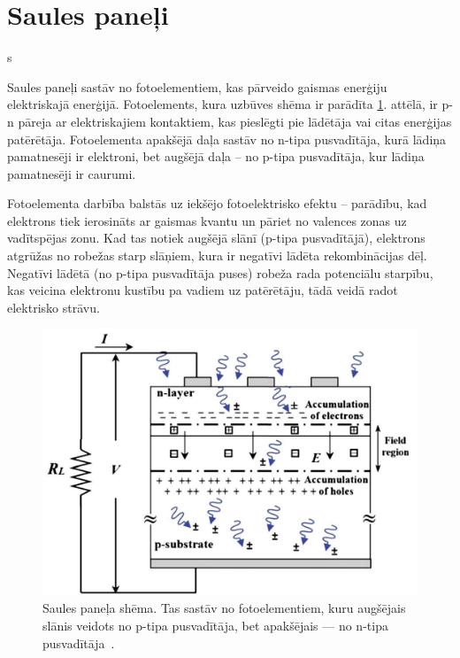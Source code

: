 \section{Saules paneļi}s

Saules paneļi sastāv no fotoelementiem, kas pārveido gaismas enerģiju elektriskajā enerģijā. Fotoelements, kura uzbūves shēma ir parādīta \ref{fig:PV}. attēlā, ir p-n pāreja ar elektriskajiem kontaktiem, kas pieslēgti pie lādētāja vai citas enerģijas patērētāja. Fotoelementa apakšējā daļa sastāv no n-tipa pusvadītāja, kurā lādiņa pamatnesēji ir elektroni, bet augšējā daļa -- no p-tipa pusvadītāja, kur lādiņa pamatnesēji ir caurumi. 

Fotoelementa darbība balstās uz iekšējo fotoelektrisko efektu -- parādību, kad elektrons tiek ierosināts ar gaismas kvantu un pāriet no valences zonas uz vadītspējas zonu. Kad tas notiek augšējā slānī (p-tipa pusvadītājā), elektrons atgrūžas no robežas starp slāņiem, kura ir negatīvi lādēta rekombinācijas dēļ. Negatīvi lādētā (no p-tipa pusvadītāja puses) robeža rada potenciālu starpību, kas veicina elektronu kustību pa vadiem uz patērētāju, tādā veidā radot elektrisko strāvu.

\begin{figure}[h]
    \centering
    \includegraphics[width=0.6\linewidth]{figures/misc/PV.jpg}
    \caption{Saules paneļa shēma. Tas sastāv no fotoelementiem, kuru augšējais slānis veidots no p-tipa pusvadītāja, bet apakšējais --- no n-tipa pusvadītāja~\cite{Yahyaoui}.}
    \label{fig:PV}
\end{figure}

